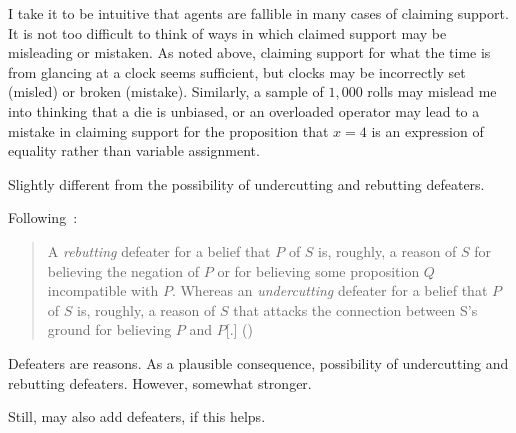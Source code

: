 \begin{note}
  I take it to be intuitive that agents are fallible in many cases of claiming support.
  It is not too difficult to think of ways in which claimed support may be misleading or mistaken.
  As noted above, claiming support for what the time is from glancing at a clock seems sufficient, but clocks may be incorrectly set (misled) or broken (mistake).
  Similarly, a sample of \(1,000\) rolls may mislead me into thinking that a die is unbiased, or an overloaded operator may lead to a mistake in claiming support for the proposition that \(x = 4\) is an expression of equality rather than variable assignment.
\end{note}

\begin{note}
  Slightly different from the possibility of undercutting and rebutting defeaters.

  Following~\citeauthor{Moretti:2018va}:
  \begin{quote}
    A \emph{rebutting} defeater for a belief that \(P\) of \(S\) is, roughly, a reason of \(S\) for believing the negation of \(P\) or for believing some proposition \(Q\) incompatible with \(P\).
    Whereas an \emph{undercutting} defeater for a belief that \(P\) of \(S\) is, roughly, a reason of \(S\) that attacks the connection between S's ground for believing \(P\) and \(P\)[.]\nolinebreak
    \mbox{}\hfill\mbox{(\citeyear{Moretti:2018va})}
  \end{quote}
\end{note}

\begin{note}
  Defeaters are reasons.
  As a plausible consequence, possibility of undercutting and rebutting defeaters.
  However, somewhat stronger.

  Still, may also add defeaters, if this helps.
\end{note}

